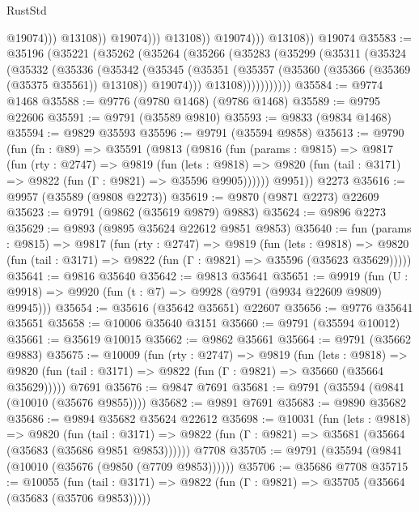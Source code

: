 \begin{lexlean}{RustStd}
\begin{coremodule}
                                  @19074)))
                            @13108))
                        @19074)))
                  @13108))
              @19074)))
        @13108))
    @19074
@35583 := @35196
    (@35221
      (@35262
        (@35264
          (@35266
            (@35283
              (@35299
                (@35311
                  (@35324
                    (@35332
                      (@35336
                        (@35342
                          (@35345
                            (@35351
                              (@35357 (@35360 (@35366 (@35369 (@35375 @35561)) @13108)) @19074)))
                          @13108)))))))))))
@35584 := @9774 @1468
@35588 := @9776 (@9780 @1468) (@9786 @1468)
@35589 := @9795 @22606
@35591 := @9791 (@35589 @9810)
@35593 := @9833 (@9834 @1468)
@35594 := @9829 @35593
@35596 := @9791 (@35594 @9858)
@35613 := @9790
    (fun (fn : @89) =>
    @35591
      (@9813
        (@9816
          (fun (params : @9815) =>
          @9817
            (fun (rty : @2747) =>
            @9819
              (fun (lets : @9818) =>
              @9820 (fun (tail : @3171) => @9822 (fun (Γ : @9821) => @35596 @9905))))))
        @9951))
    @2273
@35616 := @9957 (@35589 (@9808 @2273))
@35619 := @9870 (@9871 @2273) @22609
@35623 := @9791 (@9862 (@35619 @9879) @9883)
@35624 := @9896 @2273
@35629 := @9893 (@9895 @35624 @22612 @9851 @9853)
@35640 := fun (params : @9815) =>
  @9817
    (fun (rty : @2747) =>
    @9819
      (fun (lets : @9818) =>
      @9820 (fun (tail : @3171) => @9822 (fun (Γ : @9821) => @35596 (@35623 @35629)))))
@35641 := @9816 @35640
@35642 := @9813 @35641
@35651 := @9919
    (fun (U : @9918) => @9920 (fun (t : @7) => @9928 (@9791 (@9934 @22609 @9809) @9945)))
@35654 := @35616 (@35642 @35651) @22607
@35656 := @9776 @35641 @35651
@35658 := @10006 @35640 @3151
@35660 := @9791 (@35594 @10012)
@35661 := @35619 @10015
@35662 := @9862 @35661
@35664 := @9791 (@35662 @9883)
@35675 := @10009
    (fun (rty : @2747) =>
    @9819
      (fun (lets : @9818) =>
      @9820 (fun (tail : @3171) => @9822 (fun (Γ : @9821) => @35660 (@35664 @35629)))))
    @7691
@35676 := @9847 @7691
@35681 := @9791 (@35594 (@9841 (@10010 (@35676 @9855))))
@35682 := @9891 @7691
@35683 := @9890 @35682
@35686 := @9894 @35682 @35624 @22612
@35698 := @10031
    (fun (lets : @9818) =>
    @9820
      (fun (tail : @3171) =>
      @9822 (fun (Γ : @9821) => @35681 (@35664 (@35683 (@35686 @9851 @9853))))))
    @7708
@35705 := @9791 (@35594 (@9841 (@10010 (@35676 (@9850 (@7709 @9853))))))
@35706 := @35686 @7708
@35715 := @10055
    (fun (tail : @3171) => @9822 (fun (Γ : @9821) => @35705 (@35664 (@35683 (@35706 @9853)))))

\end{coremodule}
\end{lexlean}
